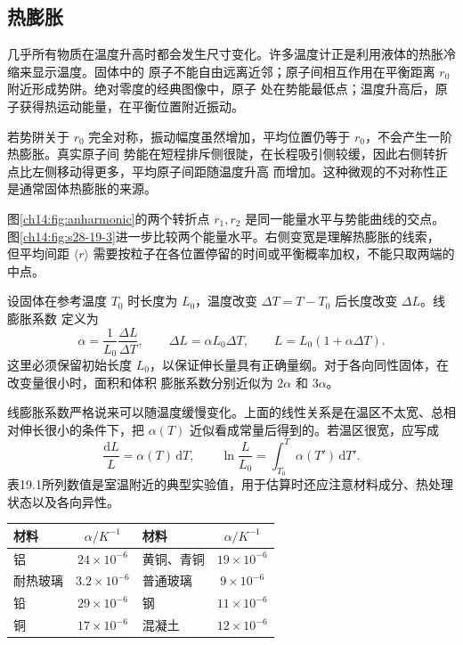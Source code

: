 \subsection{热膨胀}\label{ch14:sec:expansion}

几乎所有物质在温度升高时都会发生尺寸变化。许多温度计正是利用液体的热胀冷缩来显示温度。固体中的
原子不能自由远离近邻；原子间相互作用在平衡距离 $r_0$ 附近形成势阱。绝对零度的经典图像中，原子
处在势能最低点；温度升高后，原子获得热运动能量，在平衡位置附近振动。

若势阱关于 $r_0$ 完全对称，振动幅度虽然增加，平均位置仍等于 $r_0$，不会产生一阶热膨胀。真实原子间
势能在短程排斥侧很陡，在长程吸引侧较缓，因此右侧转折点比左侧移动得更多，平均原子间距随温度升高
而增加。这种微观的不对称性正是通常固体热膨胀的来源。

图\ref{ch14:fig:anharmonic}的两个转折点 $r_1,r_2$ 是同一能量水平与势能曲线的交点。
图\ref{ch14:fig:s28-19-3}进一步比较两个能量水平。右侧变宽是理解热膨胀的线索，
但平均间距 $\langle r\rangle$ 需要按粒子在各位置停留的时间或平衡概率加权，不能只取两端的中点。
\anharmonicPotentialDiagram

\figureNineteenThreeFaithful

设固体在参考温度 $T_0$ 时长度为 $L_0$，温度改变 $\Delta T=T-T_0$ 后长度改变 $\Delta L$。线膨胀系数
定义为
\begin{equation}
  \boxed{\alpha=\frac{1}{L_0}\frac{\Delta L}{\Delta T}},
  \qquad
  \boxed{\Delta L=\alpha L_0\Delta T},
  \qquad
  \boxed{L=L_0(1+\alpha\Delta T)}.
\end{equation}
这里必须保留初始长度 $L_0$，以保证伸长量具有正确量纲。对于各向同性固体，在改变量很小时，面积和体积
膨胀系数分别近似为 $2\alpha$ 和 $3\alpha$。

线膨胀系数严格说来可以随温度缓慢变化。上面的线性关系是在温区不太宽、总相对伸长很小的条件下，把
$\alpha(T)$ 近似看成常量后得到的。若温区很宽，应写成
\begin{equation}
  \frac{\mathrm dL}{L}=\alpha(T)\,\mathrm dT,
  \qquad
  \ln\frac{L}{L_0}=\int_{T_0}^{T}\alpha(T')\,\mathrm dT'.
\end{equation}
表19.1所列数值是室温附近的典型实验值，用于估算时还应注意材料成分、热处理状态以及各向异性。

\begin{center}
\small
\begin{tabular}{lclc}
\toprule
材料 & $\alpha/\si{K^{-1}}$ & 材料 & $\alpha/\si{K^{-1}}$\\
\midrule
铝 & $24\times10^{-6}$ & 黄铜、青铜 & $19\times10^{-6}$\\
耐热玻璃 & $3.2\times10^{-6}$ & 普通玻璃 & $9\times10^{-6}$\\
铅 & $29\times10^{-6}$ & 钢 & $11\times10^{-6}$\\
铜 & $17\times10^{-6}$ & 混凝土 & $12\times10^{-6}$\\
\bottomrule
\end{tabular}
\end{center}

